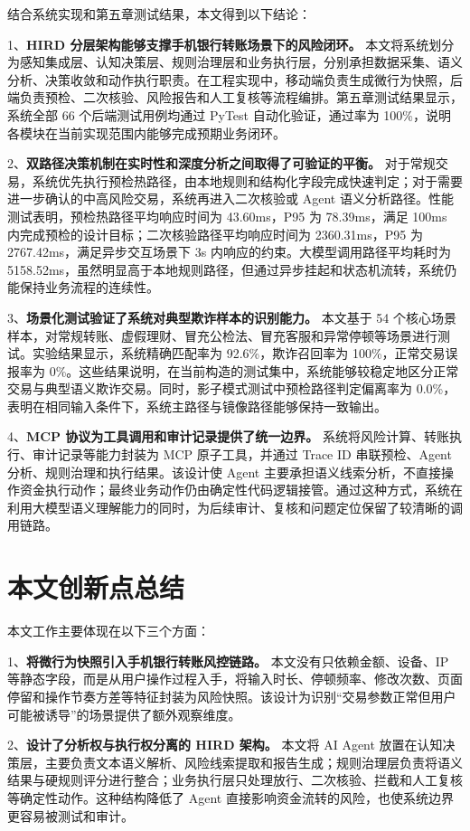 \documentclass{xduugthesis}
\begin{document}
结合系统实现和第五章测试结果，本文得到以下结论：

1、\textbf{HIRD 分层架构能够支撑手机银行转账场景下的风险闭环。} 本文将系统划分为感知集成层、认知决策层、规则治理层和业务执行层，分别承担数据采集、语义分析、决策收敛和动作执行职责。在工程实现中，移动端负责生成微行为快照，后端负责预检、二次核验、风险报告和人工复核等流程编排。第五章测试结果显示，系统全部 66 个后端测试用例均通过 PyTest 自动化验证，通过率为 100\%，说明各模块在当前实现范围内能够完成预期业务闭环。

2、\textbf{双路径决策机制在实时性和深度分析之间取得了可验证的平衡。} 对于常规交易，系统优先执行预检热路径，由本地规则和结构化字段完成快速判定；对于需要进一步确认的中高风险交易，系统再进入二次核验或 Agent 语义分析路径。性能测试表明，预检热路径平均响应时间为 43.60ms，P95 为 78.39ms，满足 100ms 内完成预检的设计目标；二次核验路径平均响应时间为 2360.31ms，P95 为 2767.42ms，满足异步交互场景下 3s 内响应的约束。大模型调用路径平均耗时为 5158.52ms，虽然明显高于本地规则路径，但通过异步挂起和状态机流转，系统仍能保持业务流程的连续性。

3、\textbf{场景化测试验证了系统对典型欺诈样本的识别能力。} 本文基于 54 个核心场景样本，对常规转账、虚假理财、冒充公检法、冒充客服和异常停顿等场景进行测试。实验结果显示，系统精确匹配率为 92.6\%，欺诈召回率为 100\%，正常交易误报率为 0\%。这些结果说明，在当前构造的测试集中，系统能够较稳定地区分正常交易与典型语义欺诈交易。同时，影子模式测试中预检路径判定偏离率为 0.0\%，表明在相同输入条件下，系统主路径与镜像路径能够保持一致输出。

4、\textbf{MCP 协议为工具调用和审计记录提供了统一边界。} 系统将风险计算、转账执行、审计记录等能力封装为 MCP 原子工具，并通过 Trace ID 串联预检、Agent 分析、规则治理和执行结果。该设计使 Agent 主要承担语义线索分析，不直接操作资金执行动作；最终业务动作仍由确定性代码逻辑接管。通过这种方式，系统在利用大模型语义理解能力的同时，为后续审计、复核和问题定位保留了较清晰的调用链路。

\section{本文创新点总结}

本文工作主要体现在以下三个方面：

1、\textbf{将微行为快照引入手机银行转账风控链路。} 本文没有只依赖金额、设备、IP 等静态字段，而是从用户操作过程入手，将输入时长、停顿频率、修改次数、页面停留和操作节奏方差等特征封装为风险快照。该设计为识别“交易参数正常但用户可能被诱导”的场景提供了额外观察维度。

2、\textbf{设计了分析权与执行权分离的 HIRD 架构。} 本文将 AI Agent 放置在认知决策层，主要负责文本语义解析、风险线索提取和报告生成；规则治理层负责将语义结果与硬规则评分进行整合；业务执行层只处理放行、二次核验、拦截和人工复核等确定性动作。这种结构降低了 Agent 直接影响资金流转的风险，也使系统边界更容易被测试和审计。
\end{document}
